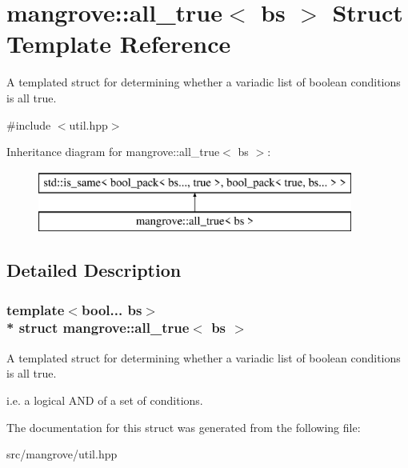 \hypertarget{structmangrove_1_1all__true}{}\section{mangrove\+:\+:all\+\_\+true$<$ bs $>$ Struct Template Reference}
\label{structmangrove_1_1all__true}


A templated struct for determining whether a variadic list of boolean conditions is all true.  




{\ttfamily \#include $<$util.\+hpp$>$}

Inheritance diagram for mangrove\+:\+:all\+\_\+true$<$ bs $>$\+:\begin{figure}[H]
\begin{center}
\leavevmode
\includegraphics[height=2.000000cm]{structmangrove_1_1all__true}
\end{center}
\end{figure}


\subsection{Detailed Description}
\subsubsection*{template$<$bool... bs$>$\\*
struct mangrove\+::all\+\_\+true$<$ bs $>$}

A templated struct for determining whether a variadic list of boolean conditions is all true. 

i.\+e. a logical A\+ND of a set of conditions. 

The documentation for this struct was generated from the following file\+:\begin{DoxyCompactItemize}
\item 
src/mangrove/util.\+hpp\end{DoxyCompactItemize}
